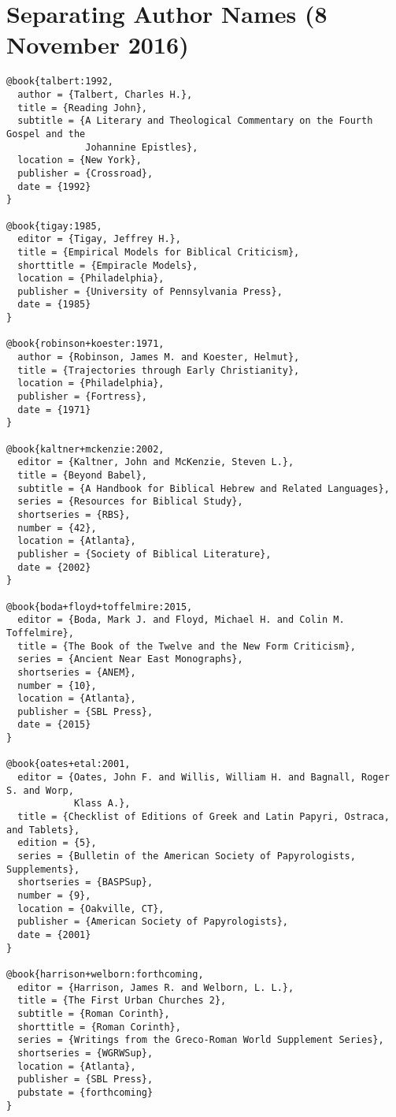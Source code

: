\documentclass[a4paper]{article}
\begin{document}
\begin{verbcite}
  \nocite{lance:1990, magness:2003, WoB, cannuyer:2016, zimmerling:2016,
    mondedelabible:2016, worldofthebible:2015, alexander+etal:1996,
    lemaire:1998}
\end{verbcite}
\exampleabbreviations
\examplebibliography
{}

\section{Separating Author Names (8 November 2016)}

\begin{verbatim}
@book{talbert:1992,
  author = {Talbert, Charles H.},
  title = {Reading John},
  subtitle = {A Literary and Theological Commentary on the Fourth Gospel and the
              Johannine Epistles},
  location = {New York},
  publisher = {Crossroad},
  date = {1992}
}

@book{tigay:1985,
  editor = {Tigay, Jeffrey H.},
  title = {Empirical Models for Biblical Criticism},
  shorttitle = {Empiracle Models},
  location = {Philadelphia},
  publisher = {University of Pennsylvania Press},
  date = {1985}
}

@book{robinson+koester:1971,
  author = {Robinson, James M. and Koester, Helmut},
  title = {Trajectories through Early Christianity},
  location = {Philadelphia},
  publisher = {Fortress},
  date = {1971}
}

@book{kaltner+mckenzie:2002,
  editor = {Kaltner, John and McKenzie, Steven L.},
  title = {Beyond Babel},
  subtitle = {A Handbook for Biblical Hebrew and Related Languages},
  series = {Resources for Biblical Study},
  shortseries = {RBS},
  number = {42},
  location = {Atlanta},
  publisher = {Society of Biblical Literature},
  date = {2002}
}

@book{boda+floyd+toffelmire:2015,
  editor = {Boda, Mark J. and Floyd, Michael H. and Colin M. Toffelmire},
  title = {The Book of the Twelve and the New Form Criticism},
  series = {Ancient Near East Monographs},
  shortseries = {ANEM},
  number = {10},
  location = {Atlanta},
  publisher = {SBL Press},
  date = {2015}
}

@book{oates+etal:2001,
  editor = {Oates, John F. and Willis, William H. and Bagnall, Roger S. and Worp,
            Klass A.},
  title = {Checklist of Editions of Greek and Latin Papyri, Ostraca, and Tablets},
  edition = {5},
  series = {Bulletin of the American Society of Papyrologists, Supplements},
  shortseries = {BASPSup},
  number = {9},
  location = {Oakville, CT},
  publisher = {American Society of Papyrologists},
  date = {2001}
}

@book{harrison+welborn:forthcoming,
  editor = {Harrison, James R. and Welborn, L. L.},
  title = {The First Urban Churches 2},
  subtitle = {Roman Corinth},
  shorttitle = {Roman Corinth},
  series = {Writings from the Greco-Roman World Supplement Series},
  shortseries = {WGRWSup},
  location = {Atlanta},
  publisher = {SBL Press},
  pubstate = {forthcoming}
}
\end{verbatim}
\end{document}
